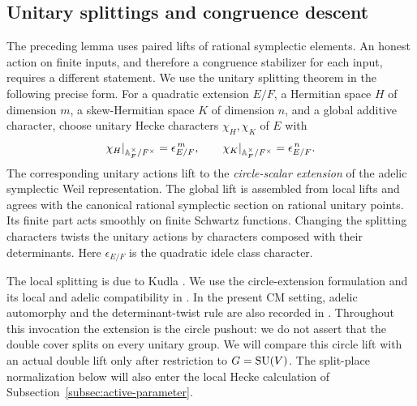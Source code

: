 \subsection{Unitary splittings and congruence descent}\label{subsec:theta-splittings}

The preceding lemma uses paired lifts of rational symplectic
elements.  An honest action on finite inputs, and therefore a
congruence stabilizer for each input, requires a different statement.
We use the unitary splitting theorem in the following precise form.
For a quadratic extension \(E/F\), a Hermitian space \(H\) of
dimension \(m\), a skew-Hermitian space \(K\) of dimension \(n\),
and a global additive character, choose unitary Hecke characters
\(\chi_H,\chi_K\) of \(E\) with
\[
 \chi_H|_{\mathbb{A}_F^\times/F^\times}=\epsilon_{E/F}^{\,m},\qquad
 \chi_K|_{\mathbb{A}_F^\times/F^\times}=\epsilon_{E/F}^{\,n}.
\]
The corresponding unitary actions lift to the \emph{circle-scalar
extension} of the adelic symplectic Weil representation.  The
global lift is assembled from local lifts and agrees with the
canonical rational symplectic section on rational unitary points.
Its finite part acts smoothly on finite Schwartz functions.
Changing the splitting characters twists the unitary actions by
characters composed with their determinants.  Here
\(\epsilon_{E/F}\) is the quadratic idele class character.

The local splitting is due to Kudla \cite{Kudla1994}.  We use the
circle-extension formulation and its local and adelic compatibility
in \cite[\S\S3.1--3.1.1 and 4.1--4.1.1]{BoradeEtAl2025ToriPeriods}.
In the present CM setting, adelic automorphy and the determinant-twist
rule are also recorded in \cite[\S7.2 and Remark~7.3]{BMM2016}.
Throughout this invocation the extension is the circle pushout:
we do not assert that the double cover splits on every unitary
group.  We will compare this circle lift with an actual double
lift only after restriction to \(G=\operatorname{SU}(V)\).
The split-place normalization below will also enter the local Hecke
calculation of Subsection~\ref{subsec:active-parameter}.

